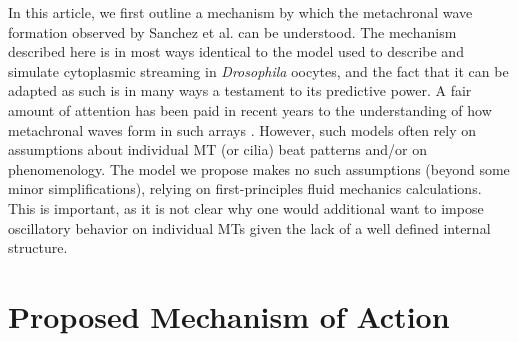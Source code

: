 \documentclass[11pt]{ucthesis}
\begin{document}
In this article, we first outline a mechanism by which the metachronal
wave formation observed by Sanchez et al. can be understood. 
The mechanism described here is in most ways
identical to the model used to describe and simulate cytoplasmic
streaming in \textit{Drosophila} oocytes, and the fact that it can
be adapted as such is in many ways a testament to its predictive
power. A fair amount of attention has been paid in recent years to
the understanding of how metachronal waves form in such arrays
\cite{Lagomarsino2003,guirao2007spontaneous,Elgeti2013,Niedermayer2008}. However, such
models often rely on assumptions about individual MT (or cilia)
beat patterns and/or on phenomenology. The model we propose makes
no such assumptions (beyond some minor simplifications), relying
on first-principles fluid mechanics calculations. This is important,
as it is not clear why one would additional want to impose oscillatory behavior
on individual MTs given the lack of a well defined internal structure.



\section{Proposed Mechanism of Action}
\label{sec:mech}
\end{document}
